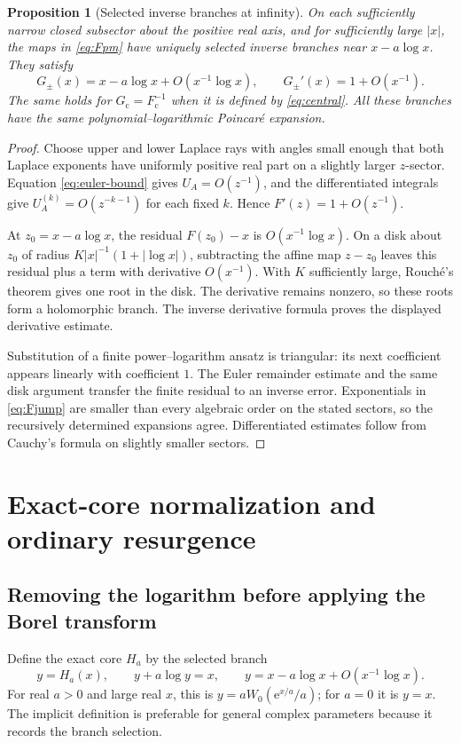 \documentclass[11pt,a4paper]{article}
\numberwithin{equation}{section}
\newtheorem{proposition}[theorem]{Proposition}
\theoremstyle{definition}
\theoremstyle{remark}
\newcommand{\e}{\mathrm e}
\newcommand{\cF}{F_{\mathrm c}}
\newcommand{\cG}{G_{\mathrm c}}
\begin{document}
\begin{proposition}[Selected inverse branches at infinity]
\label{prop:existence}
On each sufficiently narrow closed subsector about the positive real axis, and for sufficiently large $|x|$, the maps in \eqref{eq:Fpm} have uniquely selected inverse branches near $x-a\log x$. They satisfy
\begin{equation}
 G_\pm(x)=x-a\log x+O(x^{-1}\log x),
 \qquad G_\pm'(x)=1+O(x^{-1}).
 \label{eq:inverse-exists}
\end{equation}
The same holds for $\cG=\cF^{-1}$ when it is defined by \eqref{eq:central}. All these branches have the same polynomial--logarithmic Poincar\'e expansion.
\end{proposition}
\begin{proof}
Choose upper and lower Laplace rays with angles small enough that both Laplace exponents have uniformly positive real part on a slightly larger $z$-sector. Equation \eqref{eq:euler-bound} gives $U_A=O(z^{-1})$, and the differentiated integrals give $U_A^{(k)}=O(z^{-k-1})$ for each fixed $k$. Hence $F'(z)=1+O(z^{-1})$.

At $z_0=x-a\log x$, the residual $F(z_0)-x$ is $O(x^{-1}\log x)$. On a disk about $z_0$ of radius $K|x|^{-1}(1+|\log x|)$, subtracting the affine map $z-z_0$ leaves this residual plus a term with derivative $O(x^{-1})$. With $K$ sufficiently large, Rouch\'e's theorem gives one root in the disk. The derivative remains nonzero, so these roots form a holomorphic branch. The inverse derivative formula proves the displayed derivative estimate.

Substitution of a finite power--logarithm ansatz is triangular: its next coefficient appears linearly with coefficient $1$. The Euler remainder estimate and the same disk argument transfer the finite residual to an inverse error. Exponentials in \eqref{eq:Fjump} are smaller than every algebraic order on the stated sectors, so the recursively determined expansions agree. Differentiated estimates follow from Cauchy's formula on slightly smaller sectors.
\end{proof}

\section{Exact-core normalization and ordinary resurgence}
\label{sec:core}

\subsection{Removing the logarithm before applying the Borel transform}
Define the exact core $H_a$ by the selected branch
\begin{equation}
 y=H_a(x),\qquad y+a\log y=x,
 \qquad y=x-a\log x+O(x^{-1}\log x).
 \label{eq:core}
\end{equation}
For real $a>0$ and large real $x$, this is
$y=aW_0(\e^{x/a}/a)$; for $a=0$ it is $y=x$. The implicit definition is preferable for general complex parameters because it records the branch selection.
\end{document}
